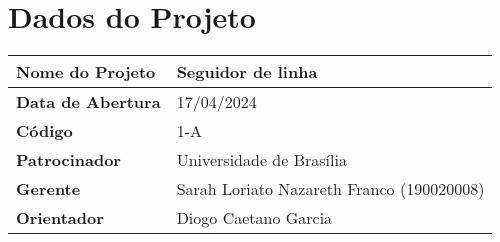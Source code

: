 \section{Dados do Projeto}

\begin{center}
  \begin{tabular}{|l|l|}
    \hline
    \textbf{Nome do Projeto} & Seguidor de linha \\
    \hline
    \textbf{Data de Abertura} & 17/04/2024 \\
    \hline
    \textbf{Código} & 1-A \\
    \hline
    \textbf{Patrocinador} & Universidade de Brasília \\
    \hline
    \textbf{Gerente} & Sarah Loriato Nazareth Franco (190020008) \\
    \hline
    \textbf{Orientador} & Diogo Caetano Garcia \\
    \hline
  \end{tabular}
\end{center}
